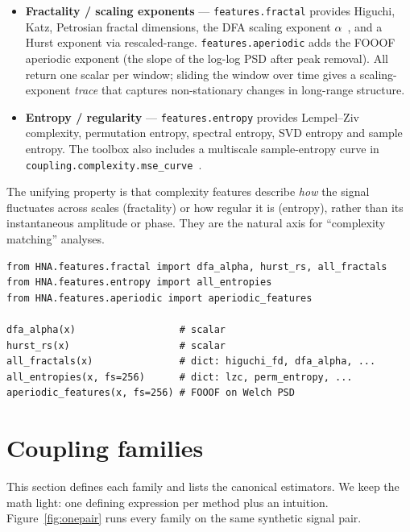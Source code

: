 \documentclass[11pt,a4paper]{article}
\begin{document}
\begin{itemize}
  \item \textbf{Fractality / scaling exponents} ---
        \texttt{features.fractal} provides Higuchi, Katz, Petrosian
        fractal dimensions, the DFA scaling exponent
        $\alpha$~\cite{Peng}, and a Hurst exponent via
        rescaled-range. \texttt{features.aperiodic} adds the
        FOOOF~\cite{Donoghue2020} aperiodic exponent (the slope of the
        log-log PSD after peak removal). All return one scalar per
        window; sliding the window over time gives a scaling-exponent
        \emph{trace} that captures non-stationary changes in
        long-range structure.
  \item \textbf{Entropy / regularity} ---
        \texttt{features.entropy} provides Lempel--Ziv complexity,
        permutation entropy, spectral entropy, SVD entropy and sample
        entropy. The toolbox also includes a multiscale
        sample-entropy curve in
        \texttt{coupling.complexity.mse\_curve}~\cite{Costa2002}.
\end{itemize}

The unifying property is that complexity features describe \emph{how}
the signal fluctuates across scales (fractality) or how regular it is
(entropy), rather than its instantaneous amplitude or phase. They are
the natural axis for ``complexity matching'' analyses.

\begin{lstlisting}
from HNA.features.fractal import dfa_alpha, hurst_rs, all_fractals
from HNA.features.entropy import all_entropies
from HNA.features.aperiodic import aperiodic_features

dfa_alpha(x)                  # scalar
hurst_rs(x)                   # scalar
all_fractals(x)               # dict: higuchi_fd, dfa_alpha, ...
all_entropies(x, fs=256)      # dict: lzc, perm_entropy, ...
aperiodic_features(x, fs=256) # FOOOF on Welch PSD
\end{lstlisting}

\section{Coupling families}
\label{sec:coupling}

This section defines each family and lists the canonical estimators. We
keep the math light: one defining expression per method plus an
intuition. Figure~\ref{fig:onepair} runs every family on the same
synthetic signal pair.
\end{document}
